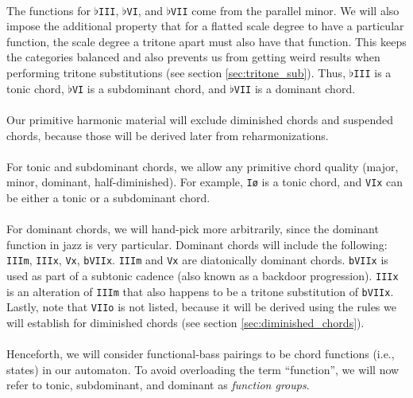\documentclass[]{article}
\begin{document}
\paragraph{}
The functions for $\flat$\texttt{III}, $\flat$\texttt{VI}, and $\flat$\texttt{VII} come from the parallel minor.  We will also impose the additional property that for a flatted scale degree to have a particular function, the scale degree a tritone apart must also have that function.  This keeps the categories balanced and also prevents us from getting weird results when performing tritone substitutions (see section \ref{sec:tritone_sub}).  Thus, $\flat$\texttt{III} is a tonic chord, $\flat$\texttt{VI} is a subdominant chord, and $\flat$\texttt{VII} is a dominant chord.

\paragraph{} Our primitive harmonic material will exclude diminished chords and suspended chords, because those will be derived later from reharmonizations.

\paragraph{} For tonic and subdominant chords, we allow any primitive chord quality (major, minor, dominant, half-diminished).  For example, \texttt{I\o} is a tonic chord, and \texttt{VIx} can be either a tonic or a subdominant chord.

\paragraph{}
For dominant chords, we will hand-pick more arbitrarily, since the dominant function in jazz is very particular.  Dominant chords will include the following: \texttt{IIIm}, \texttt{IIIx}, \texttt{Vx}, \texttt{bVIIx}.  \texttt{IIIm} and \texttt{Vx} are diatonically dominant chords.  \texttt{bVIIx} is used as part of a subtonic cadence (also known as a backdoor progression).  \texttt{IIIx} is an alteration of \texttt{IIIm} that also happens to be a tritone substitution of \texttt{bVIIx}.  Lastly, note that \texttt{VIIo} is not listed, because it will be derived using the rules we will establish for diminished chords (see section \ref{sec:diminished_chords}).

\paragraph{} Henceforth, we will consider functional-bass pairings to be chord functions (i.e., states) in our automaton.  To avoid overloading the term ``function'', we will now refer to tonic, subdominant, and dominant as \textit{function groups}.
\end{document}
